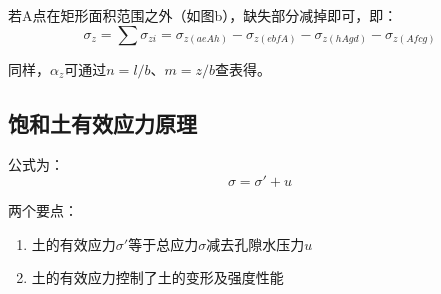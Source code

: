 \documentclass[12pt,a4paper]{ctexart}
\begin{document}
	若A点在矩形面积范围之外（如图b），缺失部分减掉即可，即：
	\begin{equation}
		\sigma_z=\sum\sigma_{zi}=\sigma_{z(aeAh)}-\sigma_{z(ebfA)}-\sigma_{z(hAgd)}-\sigma_{z(Afcg)}
	\end{equation}
	
	同样，$\alpha_z$可通过$n=l/b$、$m=z/b$查表得。
	
	\subsection{饱和土有效应力原理}
	公式为：
	\begin{equation}
		\sigma=\sigma'+u
	\end{equation}

	两个要点：
	\begin{enumerate}
		\item 土的有效应力$\sigma'$等于总应力$\sigma$减去孔隙水压力$u$
		\item 土的有效应力控制了土的变形及强度性能
	\end{enumerate}

	
	
	
	
	
	
	
	
	
	\newpage
	
	
\end{document}

